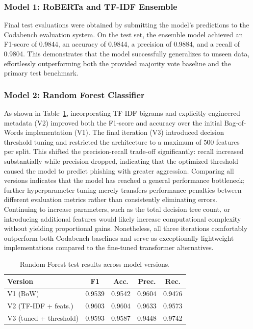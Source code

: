 \documentclass[11pt]{article}
\begin{document}
\subsubsection{Model 1: RoBERTa and TF-IDF Ensemble}
Final test evaluations were obtained by submitting the model's predictions to the Codabench evaluation system. On the test set, the ensemble model achieved an F1-score of 0.9844, an accuracy of 0.9844, a precision of 0.9884, and a recall of 0.9804. This demonstrates that the model successfully generalizes to unseen data, effortlessly outperforming both the provided majority vote baseline and the primary test benchmark.

\subsubsection{Model 2: Random Forest Classifier}

As shown in Table~\ref{tab:rf-results}, incorporating TF-IDF bigrams and explicitly engineered metadata (V2) improved both the F1-score and accuracy over the initial Bag-of-Words implementation (V1). The final iteration (V3) introduced decision threshold tuning and restricted the architecture to a maximum of 500 features per split. This shifted the precision-recall trade-off significantly: recall increased substantially while precision dropped, indicating that the optimized threshold caused the model to predict phishing with greater aggression. Comparing all versions indicates that the model has reached a general performance bottleneck; further hyperparameter tuning merely transfers performance penalties between different evaluation metrics rather than consistently eliminating errors. Continuing to increase parameters, such as the total decision tree count, or introducing additional features would likely increase computational complexity without yielding proportional gains. Nonetheless, all three iterations comfortably outperform both Codabench baselines and serve as exceptionally lightweight implementations compared to the fine-tuned transformer alternatives.

\begin{table}[h!]
\centering
\scriptsize
\begin{tabular}{lcccc}
\hline
\textbf{Version} & \textbf{F1} & \textbf{Acc.} & \textbf{Prec.} & \textbf{Rec.} \\
\hline
V1 (BoW)      & 0.9539 & 0.9542 & 0.9604 & 0.9476 \\
V2 (TF-IDF + feats.)   & 0.9603 & 0.9604 & 0.9633 & 0.9573 \\
V3 (tuned + threshold) & 0.9593 & 0.9587 & 0.9448 & 0.9742 \\
\hline
\end{tabular}
\caption{Random Forest test results across model versions.}
\label{tab:rf-results}
\end{table}
\end{document}
